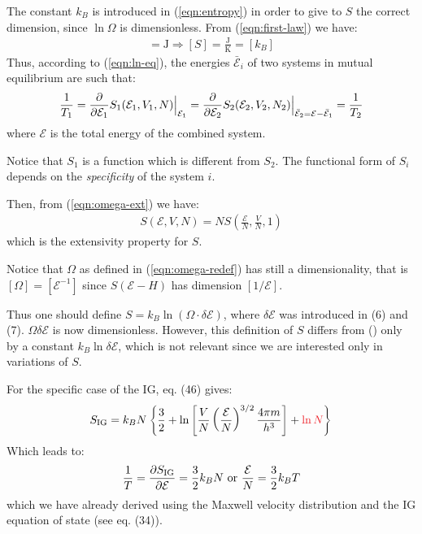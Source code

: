 \documentclass[../template.tex]{subfiles}
\begin{document}
\medskip

The constant $k_B$ is introduced in (\ref{eqn:entropy}) in order to give to $S$ the correct dimension, since $\ln \Omega$ is dimensionless. From (\ref{eqn:first-law}) we have:
\begin{align*}
    [TS] = \si{\J} \Rightarrow [S] = \frac{\si{\J}}{\si{\K}}  = [k_B]
\end{align*}
Thus, according to (\ref{eqn:ln-eq}), the energies $\bar{\mathcal{E}}_i$ of two systems in mutual equilibrium are such that:
\begin{align*}
    \frac{1}{T_1} = \pdv{\mathcal{E}_1} S_1(\mathcal{E}_1, V_1, N) \Big|_{\mathcal{E}_1} = \pdv{\mathcal{E}_2} S_2(\mathcal{E}_2, V_2, N_2) \Big|_{\bar{\mathcal{E}}_2 = \mathcal{E}- \bar{\mathcal{E}}_1} = \frac{1}{T_2} 
\end{align*}
where $\mathcal{E}$ is the total energy of the combined system.

\medskip

Notice that $S_1$ is a function which is different from $S_2$. The functional form of $S_i$ depends on the \textit{specificity} of the system $i$.

\medskip

Then, from (\ref{eqn:omega-ext}) we have:
\begin{align*}
    S(\mathcal{E}, V, N) = N S\left(\frac{\mathcal{E}}{N}, \frac{V}{N}, 1  \right)
\end{align*}
which is the extensivity property for $S$.

\begin{appr}
    Notice that $\Omega$ as defined in (\ref{eqn:omega-redef}) has still a  dimensionality, that is $[\Omega] = [\mathcal{E}^{-1}]$ since $S(\mathcal{E}-H)$ has dimension $[1/\mathcal{E}]$. %

    Thus one should define $S = k_B \ln (\Omega \cdot \delta \mathcal{E})$, where $\delta \mathcal{E}$ was introduced in (6) and (7). $\Omega \delta \mathcal{E}$ is now dimensionless. However, this definition of $S$ differs from (\label{eqn:entropy}) only by a constant $k_B \ln \delta \mathcal{E}$, which is not relevant since we are interested only in variations of $S$.
\end{appr}

For the specific case of the IG, eq. (46) gives:
\begin{align*}
    S_{\mathrm{IG}} = k_B N \left\{\frac{3}{2} + \ln\left[\frac{V}{N} \left(\frac{\mathcal{E}}{N} \right)^{3/2} \frac{4 \pi m}{h^3}  \right] + \textcolor{Red}{\ln N}  \right\}
\end{align*}
Which leads to:
\begin{align*}
    \frac{1}{T} = \pdv{S_{\mathrm{IG}}}{\mathcal{E}} = \frac{3}{2} k_B N \text{ or } \frac{\mathcal{E}}{N} = \frac{3}{2} k_B T    
\end{align*}
which we have already derived using the Maxwell velocity distribution and the IG equation of state (see eq. (34)).
\end{document}
